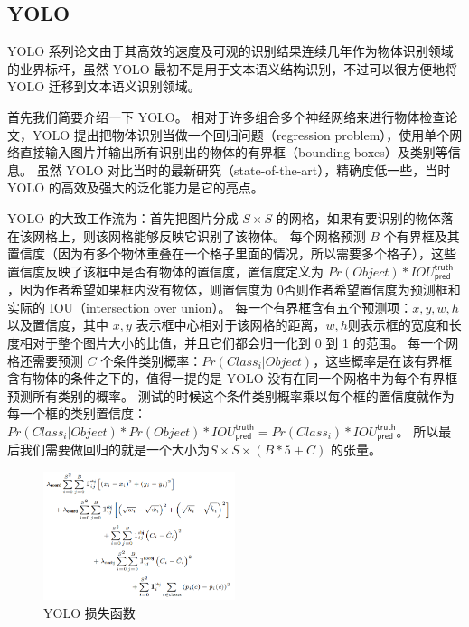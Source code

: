 \subsection{YOLO}
YOLO 系列论文由于其高效的速度及可观的识别结果连续几年作为物体识别领域的业界标杆，虽然 YOLO 最初不是用于文本语义结构识别，不过可以很方便地将 YOLO 迁移到文本语义识别领域。

首先我们简要介绍一下 YOLO\cite{YOLO}。
相对于许多组合多个神经网络来进行物体检查论文，YOLO 提出把物体识别当做一个回归问题（regression problem），使用单个网络直接输入图片并输出所有识别出的物体的有界框（bounding boxes）及类别等信息。
虽然 YOLO 对比当时的最新研究（state-of-the-art），精确度低一些，当时 YOLO 的高效及强大的泛化能力是它的亮点。

YOLO 的大致工作流为：首先把图片分成 $S \times S$ 的网格，如果有要识别的物体落在该网格上，则该网格能够反映它识别了该物体。
每个网格预测 $B$ 个有界框及其置信度（因为有多个物体重叠在一个格子里面的情况，所以需要多个格子），这些置信度反映了该框中是否有物体的置信度，置信度定义为 $Pr(Object)*IOU^{\textsf{truth}}_{\textsf{pred}}$，因为作者希望如果框内没有物体，则置信度为 $0$否则作者希望置信度为预测框和实际的 IOU（intersection over union）。
每一个有界框含有五个预测项：$x,y,w,h$ 以及置信度，其中 $x,y$ 表示框中心相对于该网格的距离，$w,h$则表示框的宽度和长度相对于整个图片大小的比值，并且它们都会归一化到 0 到 1 的范围。
每一个网格还需要预测 $C$ 个条件类别概率：$Pr(Class_i|Object)$，这些概率是在该有界框含有物体的条件之下的，值得一提的是 YOLO 没有在同一个网格中为每个有界框预测所有类别的概率。
测试的时候这个条件类别概率乘以每个框的置信度就作为每一个框的类别置信度：$Pr(Class_i|Object)*Pr(Object)*IOU^{\textsf{truth}}_{\textsf{pred}} = Pr(Class_i)*IOU^{\textsf{truth}}_{\textsf{pred}}$。
所以最后我们需要做回归的就是一个大小为$S \times S \times (B * 5 + C)$ 的张量。

\begin{figure}[h!]
	\centering
	\includegraphics[width=0.5\textwidth]{figure/resources/YOLO_loss.png}
	\caption{YOLO 损失函数\label{YOLO_loss}}
\end{figure}

